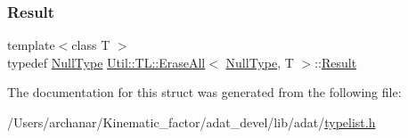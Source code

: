 \mbox{\label{structUtil_1_1TL_1_1EraseAll_3_01NullType_00_01T_01_4_ae8985ba005cb92b28012106353aa56be}} 
\subsubsection{\texorpdfstring{Result}{Result}\hspace{0.1cm}{\footnotesize\ttfamily [2/2]}}
{\footnotesize\ttfamily template$<$class T $>$ \\
typedef \mbox{\hyperlink{classUtil_1_1NullType}{Null\+Type}} \mbox{\hyperlink{structUtil_1_1TL_1_1EraseAll}{Util\+::\+T\+L\+::\+Erase\+All}}$<$ \mbox{\hyperlink{classUtil_1_1NullType}{Null\+Type}}, T $>$\+::\mbox{\hyperlink{structUtil_1_1TL_1_1EraseAll_3_01NullType_00_01T_01_4_ae8985ba005cb92b28012106353aa56be}{Result}}}



The documentation for this struct was generated from the following file\+:\begin{DoxyCompactItemize}
\item 
/\+Users/archanar/\+Kinematic\+\_\+factor/adat\+\_\+devel/lib/adat/\mbox{\hyperlink{lib_2adat_2typelist_8h}{typelist.\+h}}\end{DoxyCompactItemize}
